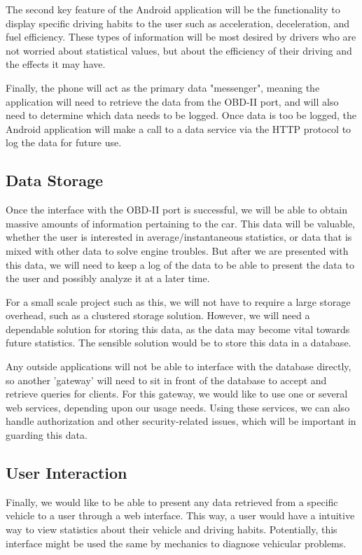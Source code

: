 \documentclass[12pt]{article}
\begin{document}
The second key feature of the Android application will be the functionality to display specific driving habits to the user such as acceleration, deceleration, and fuel efficiency.  These types of information will be most desired by drivers who are not worried about statistical values, but about the efficiency of their driving and the effects it may have.

Finally, the phone will act as the primary data "messenger", meaning the application will need to retrieve the data from the OBD-II port, and will also need to determine which data needs to be logged.  Once data is too be logged, the Android application will make a call to a data service via the HTTP protocol to log the data for future use.

\subsection{Data Storage}\label{subsec:DataStorage}
Once the interface with the OBD-II port is successful, we will be able to obtain massive amounts of information pertaining to the car.  This data will be valuable, whether the user is interested in average/instantaneous statistics, or data that is mixed with other data to solve engine troubles.  But after we are presented with this data, we will need to keep a log of the data to be able to present the data to the user and possibly analyze it at a later time. 

For a small scale project such as this, we will not have to require a large storage overhead, such as a clustered storage solution.  However, we will need a dependable solution for storing this data, as the data may become vital towards future statistics.  The sensible solution would be to store this data in a database.

Any outside applications will not be able to interface with the database directly, so another 'gateway' will need to sit in front of the database to accept and retrieve queries for clients.  For this gateway, we would like to use one or several web services, depending upon our usage needs.  Using these services, we can also handle authorization and other security-related issues, which will be important in guarding this data.

\subsection{User Interaction}\label{subsec:UserInteraction}
Finally, we would like to be able to present any data retrieved from a specific vehicle to a user through a web interface.  This way, a user would have a intuitive way to view statistics about their vehicle and driving habits.  Potentially, this interface might be used the same by mechanics to diagnose vehicular problems. 	 
\end{document}
